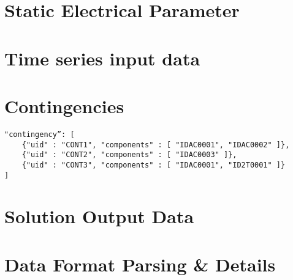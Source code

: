 \documentclass{article}
\begin{document}

\section{Static Electrical Parameter}
\label{sec:format_spec}



\section{Time series input data}


\section{Contingencies}
\label{sec:contingency}
\begin{verbatim}
"contingency”: [
    {"uid" : "CONT1", "components" : [ "IDAC0001", "IDAC0002" ]},
    {"uid" : "CONT2", "components" : [ "IDAC0003" ]},
    {"uid" : "CONT3", "components" : [ "IDAC0001", "ID2T0001" ]}    
]    
\end{verbatim}

\section{Solution Output Data}


\section{Data Format Parsing \& Details}

\end{document}
